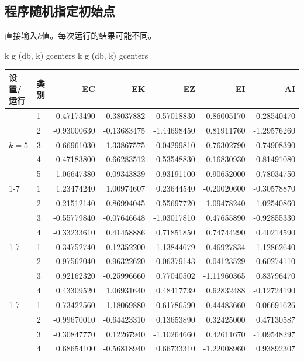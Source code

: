 \subsection{程序随机指定初始点}
直接输入$k$值。每次运行的结果可能不同。
\begin{code}
k \ROperator{<-} 
g \ROperator{<-} (db, k)
g\ROperator{\$}centers
k \ROperator{<-} 
g \ROperator{<-} (db, k)
g\ROperator{\$}centers
\end{code}
\par\addvspace{5pt}\begin{center}\begin{minipage}{\linewidth}\centering
\small
{}
\begin{tabular}{llrrrrr}\toprule
\textbf{设置/运行}&\textbf{类别}&\textbf{EC}&\textbf{EK}&\textbf{EZ}&\textbf{EI}&\textbf{AI}\\\midrule
\multirow{5}{*}{$k=5$} & 1 & -0.47173490 & 0.38037882 & 0.57018830 & 0.86005170 & 0.28540470\\
 & 2 & -0.93000630 & -0.13683475 & -1.44698450 & 0.81911760 & -1.29576260\\
 & 3 & -0.66961030 & -1.33867575 & -0.04299810 & -0.76302790 & 0.74908390\\
 & 4 & 0.47183800 & 0.66283512 & -0.53548830 & 0.16830930 & -0.81491080\\
 & 5 & 1.06647380 & 0.09343839 & 0.93191100 & -0.90652000 & 0.78034750\\
\cmidrule(lr){1-7}
\multirow{4}{*}{$k=4$，第1次} & 1 & 1.23474240 & 1.00974607 & 0.23644540 & -0.20020600 & -0.30578870\\
 & 2 & 0.21512140 & -0.86994045 & 0.55697720 & -1.09478240 & 1.02540860\\
 & 3 & -0.55779840 & -0.07646648 & -1.03017810 & 0.47655890 & -0.92855330\\
 & 4 & -0.33233610 & 0.41458886 & 0.71851850 & 0.74744290 & 0.40214590\\
\cmidrule(lr){1-7}
\multirow{4}{*}{$k=4$，第2次} & 1 & -0.34752740 & 0.12352200 & -1.13844679 & 0.46927834 & -1.12862640\\
 & 2 & -0.97562040 & -0.96322620 & 0.06379143 & -0.04123529 & 0.60274110\\
 & 3 & 0.92162320 & -0.25996660 & 0.77040502 & -1.11960365 & 0.83796470\\
 & 4 & 0.43309520 & 1.06931640 & 0.48417739 & 0.62832488 & -0.12724190\\
\cmidrule(lr){1-7}
\multirow{4}{*}{$k=4$，第3次} & 1 & 0.73422560 & 1.18069880 & 0.61786590 & 0.44483660 & -0.06691626\\
 & 2 & -0.99670010 & -0.64423310 & 0.13653890 & 0.32425000 & 0.47130587\\
 & 3 & -0.30847770 & 0.12267940 & -1.10264660 & 0.42611670 & -1.09548297\\
 & 4 & 0.68654100 & -0.56818940 & 0.66733310 & -1.22008960 & 0.93892307\\
\bottomrule\end{tabular}
\end{minipage}\end{center}

